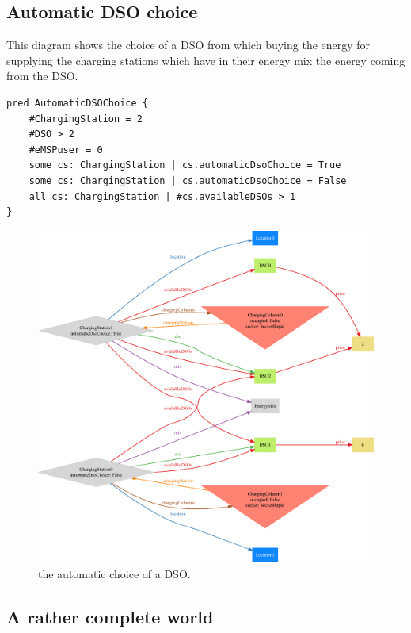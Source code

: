 \pagebreak

\subsection{Automatic DSO choice}

This diagram shows the choice of a DSO from which buying the energy for supplying the charging stations which have in their energy mix the energy coming from the DSO.

\begin{verbatim}
pred AutomaticDSOChoice {
    #ChargingStation = 2
    #DSO > 2
    #eMSPuser = 0
    some cs: ChargingStation | cs.automaticDsoChoice = True
    some cs: ChargingStation | cs.automaticDsoChoice = False
    all cs: ChargingStation | #cs.availableDSOs > 1
}
\end{verbatim}

\begin{figure}[h!]
    \centering
    \includegraphics[width=\columnwidth]{./images/alloy/autoDSO}
    \caption{the automatic choice of a DSO.}
\end{figure}

\pagebreak

\subsection{A rather complete world}

